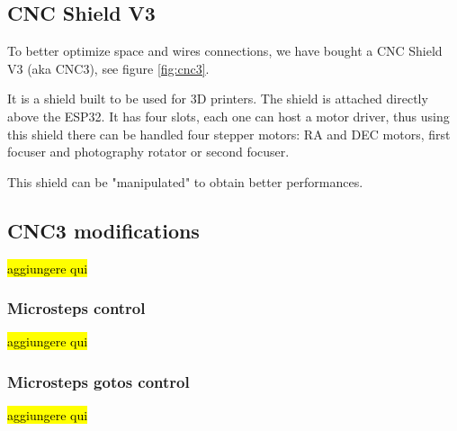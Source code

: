 
\subsection{CNC Shield V3}
To better optimize space and wires connections, we have bought a CNC Shield V3 (aka CNC3), see figure \ref{fig:cnc3}.

It is a shield built to be used for 3D printers.
The shield is attached directly above the ESP32.
It has four slots, each one can host a motor driver, thus using this shield there can be handled four stepper motors: RA and DEC motors, first focuser and photography rotator or second focuser.

This shield can be "manipulated" to obtain better performances.

\subsection{CNC3 modifications}
\hl{aggiungere qui}
\subsubsection{Microsteps control}
\hl{aggiungere qui}

\subsubsection{Microsteps gotos control}
\hl{aggiungere qui}

